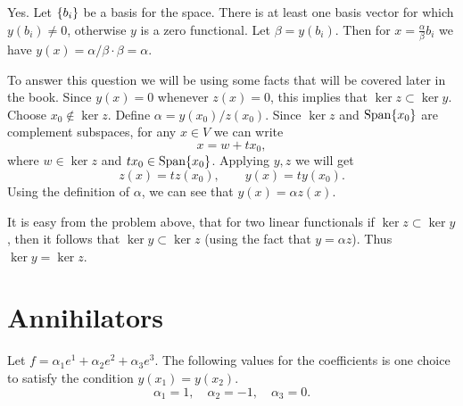 \begin{problem}
	\begin{solution}
		Yes. Let $ \{b_i\} $ be a basis for the space. There is at least one basis vector for which $ y(b_i) \neq 0 $, otherwise $ y $ is a zero functional. Let $ \beta = y(b_i) $. Then for $ x = \frac{\alpha}{\beta} b_i $ we have $ y(x) = \alpha/\beta\cdot \beta = \alpha $.
	\end{solution}
\end{problem}

\begin{problem}
	\begin{solution}
		To answer this question we will be using some facts that will be covered later in the book. Since $ y(x) =0  $ whenever $ z(x) = 0 $, this implies that $ \ker z \subset \ker y $.  Choose $ x_0 \notin \ker z $. Define $ \alpha = y(x_0)/z(x_0) $. Since $ \ker z$ and $ \operatorname{Span} \{x_0\} $ are complement subspaces, for any $ x\in V $ we can write
		\[ x = w + tx_0, \]
		where $ w \in \ker z $ and $ tx_0 \in \operatorname{Span}\{x_0\} $. Applying $ y,z $ we will get
		\[ z(x) = t z(x_0), \qquad y(x) = ty(x_0). \]
		Using the definition of $ \alpha $, we can see that $ y(x) = \alpha z(x) $.
	\end{solution}
	\begin{proposition}
		It is easy from the problem above, that for two linear functionals if $ \ker z \subset \ker y $, then it follows that $ \ker y \subset \ker z $ (using the fact that $ y = \alpha z $). Thus $ \ker y = \ker z $.
	\end{proposition}
\end{problem}


\section{Annihilators}

\begin{problem}
	\begin{solution}
		Let $ f = \alpha_1e^1 + \alpha_2 e^2 + \alpha_3 e^3 $. The following values for the coefficients is one choice to satisfy the condition $ y(x_1) = y(x_2) $.
		\[ \alpha_1 = 1,\quad \alpha_2 = -1,\quad  \alpha_3 = 0. \]
	\end{solution}
\end{problem}

